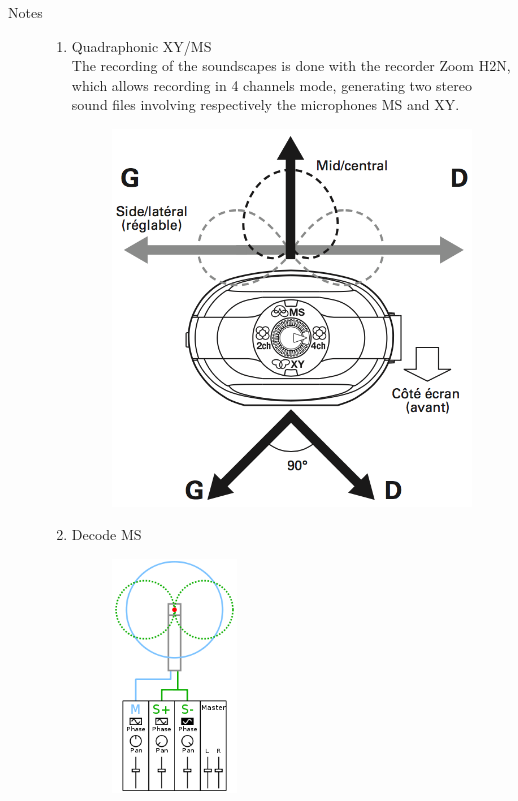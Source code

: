 \begin{description}
\item[Notes] \hfill 
\label{mp:msxy}
\begin{enumerate}
\item Quadraphonic XY/MS\\
The recording of the soundscapes is done with the recorder Zoom H2N, which allows recording in 4 channels mode, generating two stereo sound files involving respectively the microphones MS and XY.
 \begin{figure}[H]
\begin{center}
\includegraphics[scale=0.23]{mp/img/H2N.png}
\end{center}
\end{figure}
\item Decode MS\\
\begin{figure}[!hbt]
	\begin{center}
		\includegraphics[width=33mm]{mp/img/MS}

\end{center}
\end{figure}
\end{enumerate}
\end{description}
